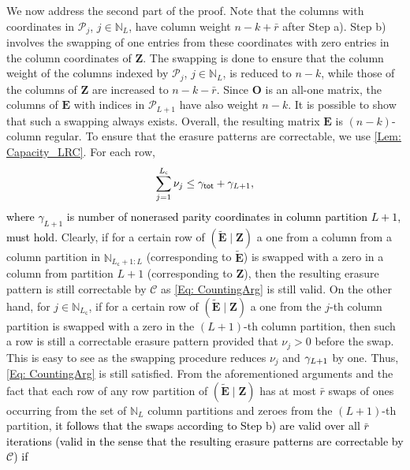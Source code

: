 \documentclass[twocolumn,conference]{IEEEtran}
\newcommand{\Nat}[1]{\mathbb{N}_{#1}}        %
\newcommand{\modify}[1]{\textcolor{black}{#1}}
\begin{document}
We now address the second part of the proof. Note that the columns with coordinates in $\mathcal P_j$, $j\in\Nat{L}$, have column weight $n-k+\bar{r}$ after Step a). Step b) involves the swapping of one entries from these coordinates with zero entries in the column coordinates of $\bm Z$. 
The swapping is done to ensure that the column weight of the columns indexed by $\mathcal P_j$, $j\in\Nat{L}$, is reduced to $n-k$, while those of the columns of $\bm Z$ are increased to $n-k-\bar{r}$. Since $\bm O$ is an all-one matrix, the columns of $\bm E$ with indices in $\mathcal P_{L+1}$ have also weight $n-k$. It is possible to show that such a swapping always exists. Overall, the resulting matrix $\bm E$ is $(n-k)$-column regular. To ensure that the erasure patterns are correctable, we use \cref{Lem: Capacity_LRC}. For each row, 
\begin{align}
\label{Eq: CountingArg}
	\sum_{j=1}^{L_{\mathsf c}}\nu_j\leq \gamma_{\mathsf{tot}}+   \modify{\gamma_{L+1}},%
\end{align} 
\modify{where $\gamma_{L+1}$ is number of nonerased parity coordinates in column partition $L+1$, must hold.} 
Clearly, if for a certain row of $(\tilde{\bm E}\mid\bm Z)$ a one from a column from a column partition in $\Nat{L_{\mathsf c}+1:L}$ (corresponding to $\tilde{\bm E}$) is swapped with a zero in a column from partition $L+1$ (corresponding to $\bm Z$), then the resulting erasure pattern is still correctable by $\mathcal C$ as \cref{Eq: CountingArg} is still valid. On the other hand, for $j\in\Nat{L_{\mathsf c}}$, if for a certain row of $(\tilde{\bm E}\mid\bm Z)$ a one from the $j$-th column partition is swapped with a zero  in the $(L+1)$-th column partition, then such a row is still a correctable erasure pattern provided that $\nu_j > 0$ before the swap. This is easy to see as the swapping procedure reduces $\nu_j$ and  $\modify{\gamma_{L+1}}$ by one. Thus, \cref{Eq: CountingArg} is still satisfied. From the aforementioned arguments and the fact that each row of any row partition of $(\tilde{\bm E}\mid\bm Z)$ has at most $\bar r$ swaps of ones occurring from the set of $\Nat{L}$ column partitions and zeroes from the $(L+1)$-th partition,  \modify{it follows that the swaps according to Step b)  are valid over all $\bar{r}$ iterations  (valid in the sense that the resulting erasure patterns are correctable by $\mathcal{C}$) if }
\end{document}
